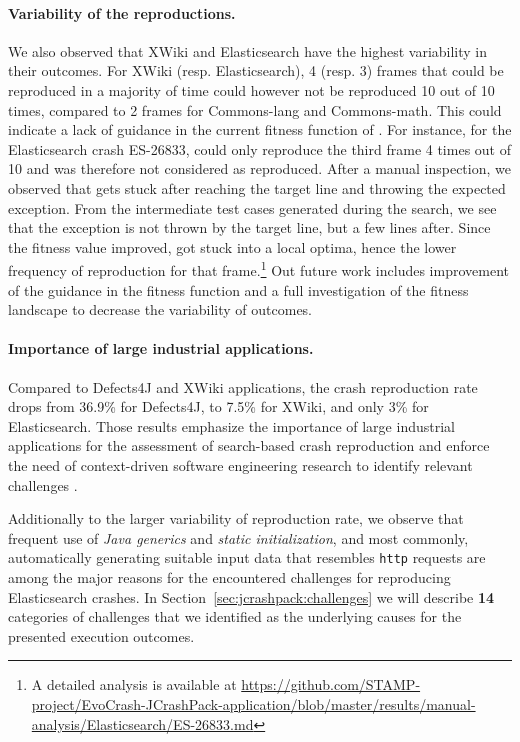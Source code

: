 \paragraph{Variability of the reproductions.}

We also observed that XWiki and Elasticsearch have the highest variability in their outcomes. 
For XWiki (resp. Elasticsearch), 4 (resp. 3) frames that could be reproduced in a majority of time could however not be reproduced 10 out of 10 times, compared to 2 frames for Commons-lang and Commons-math. 
This could indicate a lack of guidance in the current fitness function of \evocrash. 
For instance, for the Elasticsearch crash ES-26833, \evocrash could only reproduce the third frame 4 times out of 10 and was therefore not considered as reproduced. 
After a manual inspection, we observed that \evocrash gets stuck after reaching the target line and throwing the expected exception. 
From the intermediate test cases generated during the search, we see that the exception is not thrown by the target line, but a few lines after. 
Since the fitness value improved, \evocrash got stuck into a local optima, hence the lower frequency of reproduction  for that frame.\footnote{A detailed analysis is available at \url{https://github.com/STAMP-project/EvoCrash-JCrashPack-application/blob/master/results/manual-analysis/Elasticsearch/ES-26833.md}}
Out future work includes improvement of the guidance in the fitness function and a full investigation of the fitness landscape to decrease the variability of \evocrash outcomes. 


\paragraph{Importance of large industrial applications.}

Compared to Defects4J and XWiki applications, the crash reproduction rate drops from 36.9\% for Defects4J, to 7.5\% for XWiki, and only 3\% for Elasticsearch. Those results emphasize the importance of large industrial applications for the assessment of search-based crash reproduction and enforce the need of context-driven software engineering research to identify relevant challenges \cite{Briand2017a}. 

Additionally to the larger variability of reproduction rate, we observe that frequent use of \textit{Java generics} and \textit{static initialization}, and most commonly, automatically generating suitable input data that resembles \texttt{http} requests are among the major reasons for the encountered challenges for reproducing Elasticsearch crashes.
In Section~\ref{sec:jcrashpack:challenges} we will describe \textbf{14} categories of challenges that we identified as the underlying causes for the presented execution outcomes.

